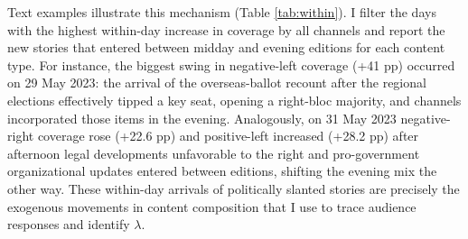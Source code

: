 \documentclass[12pt]{article}
\begin{document}
	
	
	Text examples illustrate this mechanism (Table \ref{tab:within}). I filter the days with the highest within-day increase in coverage by all channels and report the new stories that entered between midday and evening editions for each content type. For instance, the biggest swing in negative-left coverage (+41 pp) occurred on 29 May 2023: the arrival of the overseas-ballot recount after the regional elections effectively tipped a key seat, opening a right-bloc majority, and channels incorporated those items in the evening. Analogously, on 31 May 2023 negative-right coverage rose (+22.6 pp) and positive-left increased (+28.2 pp) after afternoon legal developments unfavorable to the right and pro-government organizational updates entered between editions, shifting the evening mix the other way. These within-day arrivals of politically slanted stories are precisely the exogenous movements in content composition that I use to trace audience responses and identify $\lambda$.
	
	
	
	
	
\end{document}
